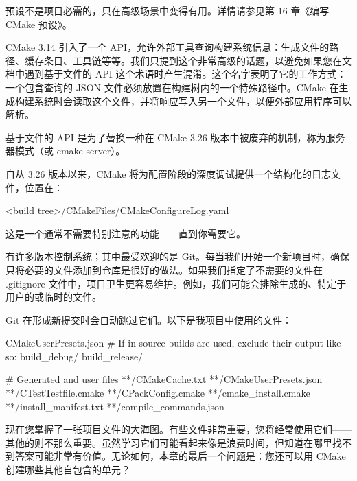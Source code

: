 预设不是项目必需的，只在高级场景中变得有用。详情请参见第 16 章《编写 CMake 预设》。


CMake 3.14 引入了一个 API，允许外部工具查询构建系统信息：生成文件的路径、缓存条目、工具链等等。我们只提到这个非常高级的话题，以避免如果您在文档中遇到基于文件的 API 这个术语时产生混淆。这个名字表明了它的工作方式：一个包含查询的 JSON 文件必须放置在构建树内的一个特殊路径中。CMake 在生成构建系统时会读取这个文件，并将响应写入另一个文件，以便外部应用程序可以解析。

基于文件的 API 是为了替换一种在 CMake 3.26 版本中被废弃的机制，称为服务器模式（或 cmake-server）。


自从 3.26 版本以来，CMake 将为配置阶段的深度调试提供一个结构化的日志文件，位置在：

\begin{shell}
<build tree>/CMakeFiles/CMakeConfigureLog.yaml
\end{shell}

这是一个通常不需要特别注意的功能——直到你需要它。


有许多版本控制系统；其中最受欢迎的是 Git。每当我们开始一个新项目时，确保只将必要的文件添加到仓库是很好的做法。如果我们指定了不需要的文件在 .gitignore 文件中，项目卫生更容易维护。例如，我们可能会排除生成的、特定于用户的或临时的文件。

Git 在形成新提交时会自动跳过它们。以下是我项目中使用的文件：


\begin{shell}
CMakeUserPresets.json
# If in-source builds are used, exclude their output like so:
build_debug/
build_release/

# Generated and user files
**/CMakeCache.txt
**/CMakeUserPresets.json
**/CTestTestfile.cmake
**/CPackConfig.cmake
**/cmake_install.cmake
**/install_manifest.txt
**/compile_commands.json
\end{shell}

现在您掌握了一张项目文件的大海图。有些文件非常重要，您将经常使用它们——其他的则不那么重要。虽然学习它们可能看起来像是浪费时间，但知道在哪里找不到答案可能非常有价值。无论如何，本章的最后一个问题是：您还可以用 CMake 创建哪些其他自包含的单元？





























